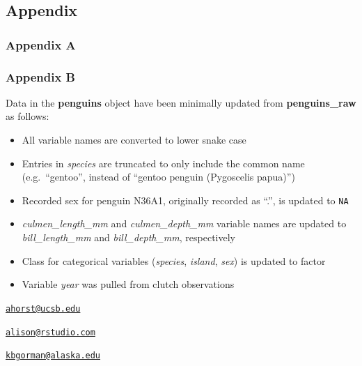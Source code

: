 \hypertarget{appendix}{%
\subsection{Appendix}\label{appendix}}

\hypertarget{appendix-a}{%
\subsubsection{Appendix A}\label{appendix-a}}

\hypertarget{appendix-b}{%
\subsubsection{Appendix B}\label{appendix-b}}

Data in the \textbf{penguins} object have been minimally updated from
\textbf{penguins\_raw} as follows:

\begin{itemize}
\tightlist
\item
  All variable names are converted to lower snake case
\item
  Entries in \emph{species} are truncated to only include the common
  name (e.g.~``gentoo'', instead of ``gentoo penguin (Pygoscelis
  papua)'')
\item
  Recorded sex for penguin N36A1, originally recorded as ``.'', is
  updated to \texttt{NA}
\item
  \emph{culmen\_length\_mm} and \emph{culmen\_depth\_mm} variable names
  are updated to \emph{bill\_length\_mm} and \emph{bill\_depth\_mm},
  respectively
\item
  Class for categorical variables (\emph{species}, \emph{island},
  \emph{sex}) is updated to factor
\item
  Variable \emph{year} was pulled from clutch observations
\end{itemize}




\address{%
Allison M. Horst\\
Bren School of Environmental Science and Management\\
University of California, Santa Barbara\\ Santa Barbara, CA 93106-5131\\
}
\href{mailto:ahorst@ucsb.edu}{\nolinkurl{ahorst@ucsb.edu}}

\address{%
Alison P. Hill\\
RStudio, PBC\\
250 Northern Ave\\ Boston, MA 02210\\
}
\href{mailto:alison@rstudio.com}{\nolinkurl{alison@rstudio.com}}

\address{%
Kristen B. Gorman\\
University of Alaska Fairbanks College of Fisheries and Ocean Sciences\\
2150 Koyukuk Drive\\ 245 O'Neill Building\\ Fairbanks, AK 99775-7220\\
}
\href{mailto:kbgorman@alaska.edu}{\nolinkurl{kbgorman@alaska.edu}}

